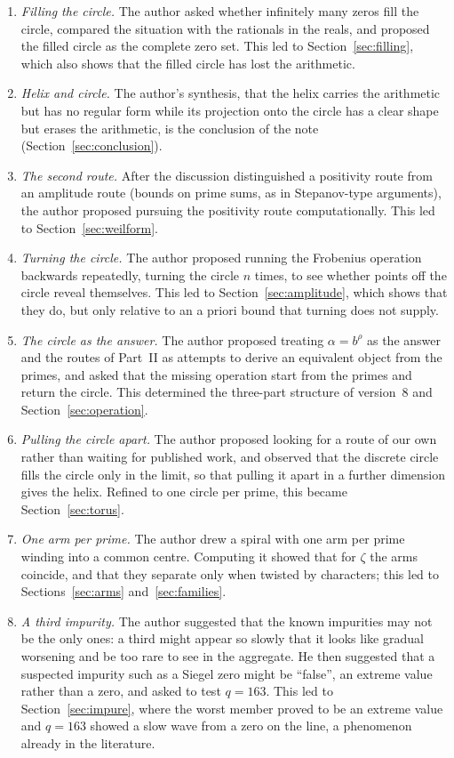 \documentclass[11pt,a4paper]{article}
\theoremstyle{definition}\newtheorem{definition}[proposition]{Definition}
\theoremstyle{remark}\newtheorem{remark}[proposition]{Remark}
\begin{document}
\begin{enumerate}[label=(\arabic*),itemsep=1pt]
\item \emph{Filling the circle.} The author asked whether infinitely many zeros fill the circle, compared the situation with the rationals in the reals, and proposed the filled circle as the complete zero set. This led to Section~\ref{sec:filling}, which also shows that the filled circle has lost the arithmetic.
\item \emph{Helix and circle.} The author's synthesis, that the helix carries the arithmetic but has no regular form while its projection onto the circle has a clear shape but erases the arithmetic, is the conclusion of the note (Section~\ref{sec:conclusion}).
\item \emph{The second route.} After the discussion distinguished a positivity route from an amplitude route (bounds on prime sums, as in Stepanov-type arguments), the author proposed pursuing the positivity route computationally. This led to Section~\ref{sec:weilform}.
\item \emph{Turning the circle.} The author proposed running the Frobenius operation backwards repeatedly, turning the circle $n$ times, to see whether points off the circle reveal themselves. This led to Section~\ref{sec:amplitude}, which shows that they do, but only relative to an a priori bound that turning does not supply.
\item \emph{The circle as the answer.} The author proposed treating $\alpha=b^\rho$ as the answer and the routes of Part~II as attempts to derive an equivalent object from the primes, and asked that the missing operation start from the primes and return the circle. This determined the three-part structure of version~8 and Section~\ref{sec:operation}.
\item \emph{Pulling the circle apart.} The author proposed looking for a route of our own rather than waiting for published work, and observed that the discrete circle fills the circle only in the limit, so that pulling it apart in a further dimension gives the helix. Refined to one circle per prime, this became Section~\ref{sec:torus}.
\item \emph{One arm per prime.} The author drew a spiral with one arm per prime winding into a common centre. Computing it showed that for $\zeta$ the arms coincide, and that they separate only when twisted by characters; this led to Sections~\ref{sec:arms} and~\ref{sec:families}.
\item \emph{A third impurity.} The author suggested that the known impurities may not be the only ones: a third might appear so slowly that it looks like gradual worsening and be too rare to see in the aggregate. He then suggested that a suspected impurity such as a Siegel zero might be ``false'', an extreme value rather than a zero, and asked to test $q=163$. This led to Section~\ref{sec:impure}, where the worst member proved to be an extreme value and $q=163$ showed a slow wave from a zero on the line, a phenomenon already in the literature.

\end{enumerate}
\end{document}
